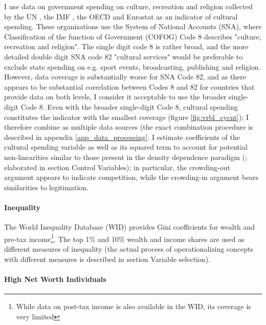 \documentclass[11pt]{article}
\begin{document}
I use data on government spending on culture, recreation and religion collected by the UN \parencite{UN_2022_consumption}, the IMF \parencite{IMF_2022_GFS}, the OECD \parencite{OECD_2022_SNA_TABLE11_ARCHIVE,OECD_2022_SNA_TABLE11} and Eurostat \parencite{Eurostat_2022_COFOG} as an indicator of cultural spending.
These organizations use the System of National Accounts (SNA), where Classification of the function of Government (COFOG) Code 8 describes "culture, recreation and religion".
The single digit code 8 is rather broad, and the more detailed  double digit SNA code 82 "cultural services" would be preferable to exclude state spending on e.g. sport events, broadcasting, publishing and religion. 
However, data coverage is substantially worse for SNA Code 82, and as there appears to be substantial correlation between Codes 8 and 82 for countries that provide data on both levels, I consider it acceptable to use the broader single-digit Code 8.
Even with the broader single-digit Code 8, cultural spending constitutes the indicator with the smallest coverage (figure \ref{fig:vrbl_cycnt}); I therefore combine as multiple data sources (the exact combination procedure is described in appendix \ref{app_data_processing}.
I estimate coefficients of the cultural spending variable as well as its squared term to account for potential non-linearities similar to those present in the density dependence paradigm (\cite{Hannan_1992_dynamics};  elaborated in section Control Variables); in particular, the crowding-out argument appears to indicate competition, while the crowding-in argument bears similarities to legitimation.


\paragraph*{Inequality}

The World Inequality Database (WID) provides Gini coefficients for wealth and pre-tax income\footnote{While data on post-tax income is also available in the WID, its coverage is very limited}.
The top 1\% and 10\% wealth and income shares are used as different measures of inequality (the actual process of operationalizing concepts with different measures is described in section Variable selection).


\paragraph*{High Net Worth Individuals}
\end{document}
